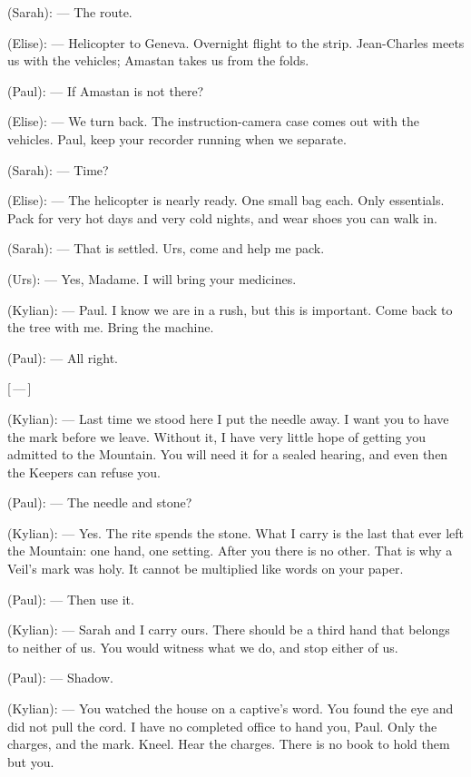\begin{room}
(Sarah): --- The route.

(Elise): --- Helicopter to Geneva. Overnight flight to the strip. Jean-Charles meets us with the vehicles; Amastan takes us from the folds.

(Paul): --- If Amastan is not there?

(Elise): --- We turn back. The instruction-camera case comes out with the vehicles. Paul, keep your recorder running when we separate.

(Sarah): --- Time?

(Elise): --- The helicopter is nearly ready. One small bag each. Only essentials. Pack for very hot days and very cold nights, and wear shoes you can walk in.

(Sarah): --- That is settled. Urs, come and help me pack.

(Urs): --- Yes, Madame. I will bring your medicines.

(Kylian): --- Paul. I know we are in a rush, but this is important. Come back to the tree with me. Bring the machine.

(Paul): --- All right.

\centerline{[\,---\,]}

(Kylian): --- Last time we stood here I put the needle away. I want you to have the mark before we leave. Without it, I have very little hope of getting you admitted to the Mountain. You will need it for a sealed hearing, and even then the Keepers can refuse you.

(Paul): --- The needle and stone?

(Kylian): --- Yes. The rite spends the stone. What I carry is the last that ever left the Mountain: one hand, one setting. After you there is no other. That is why a Veil's mark was holy. It cannot be multiplied like words on your paper.

(Paul): --- Then use it.

(Kylian): --- Sarah and I carry ours. There should be a third hand that belongs to neither of us. You would witness what we do, and stop either of us.

(Paul): --- Shadow.

(Kylian): --- You watched the house on a captive's word. You found the eye and did not pull the cord. I have no completed office to hand you, Paul. Only the charges, and the mark. Kneel. Hear the charges. There is no book to hold them but you.


\end{room}
